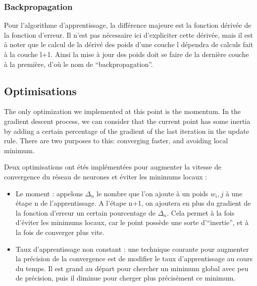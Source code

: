 \begin{center}
\end{center}

\subsubsection{Backpropagation}
Pour l'algorithme d'apprentissage, la différence majeure est la fonction dérivée de la fonction d'erreur. Il n'est pas nécessaire ici d'expliciter cette dérivée, mais il est à noter que le calcul de la dérivé des poids d'une couche l dépendra de calculs fait à la couche l+1. Ainsi la mise à jour des poids doit se faire de la dernière couche à la première, d'où le nom de ``backpropagation''.

\subsection{Optimisations}

The only optimization we implemented at this point is the momentum. In the
gradient descent process, we can consider that the current point has some
inertia by adding a certain percentage of the gradient of the last iteration in
the update rule. There are two purposes to this: converging faster, and avoiding
local minimum.

Deux optimisations ont étés implémentées pour augmenter la vitesse de convergence du réseau de neurones et éviter les minimums locaux :
\begin{itemize}
  \item Le moment : appelons $\Delta_n$ le nombre que l'on ajoute à un poids $w_i,j$ à une étape n de l'apprentissage. A l'étape n+1, on ajoutera en plus du gradient de la fonction d'erreur un certain pourcentage de $\Delta_n$. Cela permet à la fois d'éviter les minimums locaux, car le point possède une sorte d'``inertie'', et à la fois de converger plus vite.
  \item Taux d'apprentissage non constant : une technique courante pour augmenter la précision de la convergence est de modifier le taux d'apprentissage au cours du temps. Il est grand au départ pour chercher un minimum global avec peu de précision, puis il diminue pour cherger plus précisément ce minimum.
\end{itemize}

